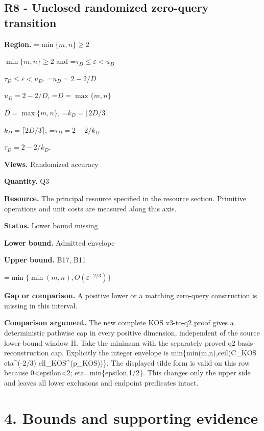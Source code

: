 \documentclass[10pt,a4paper]{article}
\newcommand{\AtlasMath}[1]{\par\begingroup\centering\setbox0=\hbox{$\displaystyle #1$}\ifdim\wd0>1.4\linewidth\typeout{ATLAS WIDE FORMULA: \the\wd0}\fi\ifdim\wd0>\linewidth\resizebox{\linewidth}{!}{\box0}\else\box0\fi\par\endgroup}
\newcommand{\AtlasInlineMath}[1]{\begingroup\setbox0=\hbox{$#1$}\ifdim\wd0>.4\linewidth\endgroup\AtlasMath{#1}\else\endgroup$#1$\fi}
\begin{document}
\subsection{R8 - Unclosed randomized zero-query transition}


\textbf{Region.} \AtlasInlineMath{\min\{m,n\}\ge2} and \AtlasInlineMath{\tau_D\le\varepsilon<u_D}. \AtlasInlineMath{u_D=2-2/D}, \AtlasInlineMath{D=\max\{m,n\}}, \AtlasInlineMath{k_D=\lceil2D/3\rceil}, \AtlasInlineMath{\tau_D=2-2/k_D}.



\textbf{Views.} Randomized accuracy



\textbf{Quantity.} Q3



\textbf{Resource.} The principal resource specified in the resource section. Primitive operations and unit costs are measured along this axis.



\textbf{Status.} Lower bound missing



\textbf{Lower bound.} Admitted envelope



\textbf{Upper bound.} B17, B11



\AtlasMath{\min\{\min(m,n),\widetilde O(\varepsilon^{-2/3})\}}


\textbf{Gap or comparison.} A positive lower or a matching zero-query construction is missing in this interval.



\textbf{Comparison argument.} The new complete KOS v3-to-q2 proof gives a deterministic pathwise cap in every positive dimension, independent of the source lower-bound window H. Take the minimum with the separately proved q2 basis-reconstruction cap. Explicitly the integer envelope is min\{min(m,n),ceil(C\_KOS eta\textasciicircum{}(-2/3) ell\_KOS\textasciicircum{}(p\_KOS))\}. The displayed tilde form is valid on this row because 0<epsilon<2; eta=min\{epsilon,1/2\}. This changes only the upper side and leaves all lower exclusions and endpoint predicates intact.



\section{4. Bounds and supporting evidence}
\end{document}
